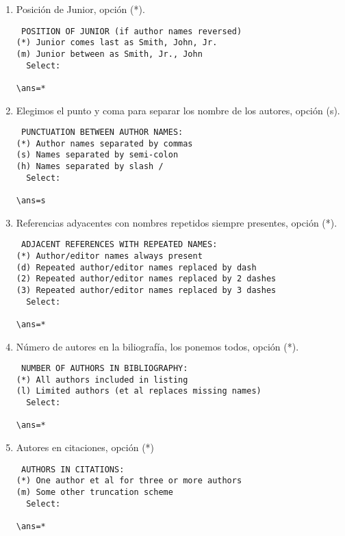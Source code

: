 \begin{enumerate}
\begin{verbatim}
\ans=*
\end{verbatim}

\item Posición de Junior, opción (*).

\begin{verbatim}
 POSITION OF JUNIOR (if author names reversed)
(*) Junior comes last as Smith, John, Jr.
(m) Junior between as Smith, Jr., John
  Select:

\ans=*
\end{verbatim}

\item Elegimos el punto y coma para separar los nombre de los autores, opción (s).

\begin{verbatim}
 PUNCTUATION BETWEEN AUTHOR NAMES:
(*) Author names separated by commas 
(s) Names separated by semi-colon 
(h) Names separated by slash /
  Select:

\ans=s
\end{verbatim}

\item Referencias adyacentes con nombres repetidos siempre presentes, opción (*).

\begin{verbatim}
 ADJACENT REFERENCES WITH REPEATED NAMES:
(*) Author/editor names always present 
(d) Repeated author/editor names replaced by dash 
(2) Repeated author/editor names replaced by 2 dashes 
(3) Repeated author/editor names replaced by 3 dashes 
  Select:

\ans=*

\end{verbatim}

\item Número de autores en la biliografía,  los ponemos todos, opción (*).

\begin{verbatim}
 NUMBER OF AUTHORS IN BIBLIOGRAPHY:
(*) All authors included in listing
(l) Limited authors (et al replaces missing names)
  Select:

\ans=*
\end{verbatim}

\item Autores en citaciones, opción (*)

\begin{verbatim}
 AUTHORS IN CITATIONS:
(*) One author et al for three or more authors
(m) Some other truncation scheme 
  Select:

\ans=*


\end{verbatim}
\end{enumerate}
